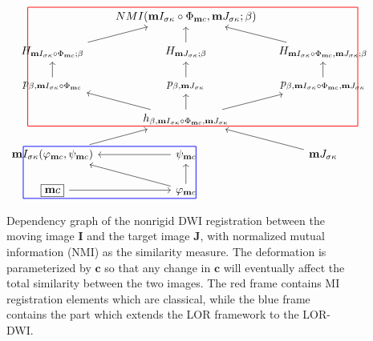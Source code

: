 \documentclass[twocolumn]{svjour3}
\begin{document}
\begin{figure}[ht]

\begin{equation*}
\begin{tikzcd}[column sep=0.4cm,row sep=0.5cm]
  ~& NMI( \bm I_{\sigma\kappa}\circ\Phi_{\bm c},\bm J_{\sigma\kappa};\beta)&~\\
  H_{\bm I_{\sigma\kappa}\circ\Phi_{\bm c};\beta} \ar[ur]&  
  H_{\bm J_{\sigma\kappa};\beta}\ar[u] & 
  H_{\bm I_{\sigma\kappa}\circ\Phi_{\bm c}, \bm J_{\sigma\kappa};\beta}\ar[lu]\\
  p_{\beta,\bm I_{\sigma\kappa}\circ\Phi_{\bm c}}\ar[u]  & 
  p_{\beta,\bm J_{\sigma\kappa}}\ar[u]  & 
  p_{\beta,\bm I_{\sigma\kappa}\circ\Phi_{\bm c}, \bm J_{\sigma\kappa}}\ar[u]\\
  ~ & h_{\beta,\bm I_{\sigma\kappa}\circ\Phi_{\bm c},\bm J_{\sigma\kappa}}\ar[ul]\ar[u]\ar[ur]& ~\\
  \bm I_{\sigma\kappa}(\phi_{\bm c},\psi_{\bm c})\ar[ur]&\psi_{\bm c}\ar[l]&\bm J_{\sigma\kappa}\ar[ul]\\
  \boxed{\bm c}\ar[r ]& \phi_{\bm c}\ar[lu] \ar[u]&
  \ar[from=1-1,to=1-3,color=red,dash,line width=0.65pt,start
  anchor={[xshift=-2.2em,yshift=2ex]center},end
  anchor={[xshift=+3.1em,yshift=2ex]center}]
  \ar[from=1-1,to=4-1,color=red,dash,line width=0.65pt,start
  anchor={[xshift=-2.2em,yshift=2ex]center},end
  anchor={[xshift=-2.2em,yshift=-1.5ex]center}]
  \ar[from=4-1,to=4-3,color=red,dash,line width=0.65pt,start
  anchor={[xshift=-2.2em,yshift=-1.5ex]center},end
  anchor={[xshift=+3.1em,yshift=-1.5ex]center}]
  \ar[from=1-3,to=4-3,color=red,dash,line width=0.65pt,start
  anchor={[xshift=+3.1em,yshift=2ex]center},end
  anchor={[xshift=+3.1em,yshift=-1.5ex]center}]
  \ar[from=5-1,to=5-2,color=blue,dash,line width=0.65pt,start
  anchor={[xshift=-2.6em,yshift=1.7ex]center},end
  anchor={[xshift=+0.9em,yshift=1.7ex]center}]
  \ar[from=6-1,to=6-2,color=blue,dash,line width=0.65pt,start
  anchor={[xshift=-2.6em,yshift=-1.7ex]center},end
  anchor={[xshift=+0.9em,yshift=-1.7ex]center}]
  \ar[from=5-1,to=6-1,color=blue,dash,line width=0.65pt,start
  anchor={[xshift=-2.6em,yshift=1.7ex]center},end
  anchor={[xshift=-2.6em,yshift=-1.7ex]center}]
  \ar[from=5-2,to=6-2,color=blue,dash,line width=0.65pt,start
  anchor={[xshift=+0.9em,yshift=1.7ex]center},end
  anchor={[xshift=+0.9em,yshift=-1.7ex]center}]
\end{tikzcd}
\end{equation*}
\caption{Dependency graph of the nonrigid DWI registration between the moving image
  $\bm I$ and the target image $\bm J$, with normalized mutual information (NMI) as the
  similarity measure. The deformation is parameterized by $\bm c$ so that any change in
  $\bm c$ will eventually affect the total similarity between the two images. The red
  frame contains MI registration elements which are classical, while the blue frame
  contains the part which extends the LOR framework to the LOR-DWI.}
    \label{fig:dependcygraph}
\end{figure}
\end{document}
